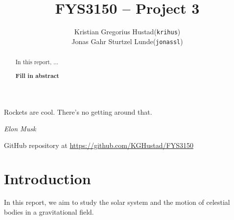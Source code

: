 \documentclass[a4paper]{article}
\begin{document}
\title{FYS3150 -- Project 3}
\author{
    \begin{tabular}{r l}
        Kristian Gregorius Hustad & (\texttt{krihus})\\
        Jonas Gahr Sturtzel Lunde & (\texttt{jonassl})
    \end{tabular}}

\maketitle




\setlength{\epigraphwidth}{0.75\textwidth}
\renewcommand{\epigraphflush}{center}
\renewcommand{\beforeepigraphskip}{50pt}
\renewcommand{\afterepigraphskip}{100pt}
\renewcommand{\epigraphsize}{\normalsize}

\epigraph{Rockets are cool. There's no getting around that.}
{\textit{Elon Musk}}


\begin{abstract}
\noindent
In this report, ...

\textbf{Fill in abstract}
\end{abstract}

\vfill


\begin{center}
    GitHub repository at \url{https://github.com/KGHustad/FYS3150}
\end{center}

\newpage

\newcommand{\half}{\frac{1}{2}}
\newcommand{\dt}{{\Delta t}}
\newcommand{\dx}{{\Delta x}}
\newcommand{\bigO}{{\mathcal{O}}}



\section{Introduction}\label{sec:intro}
\cite{mhj_lecture_notes} %

In this report, we aim to study the solar system and the motion of celestial bodies in a gravitational field.
\end{document}
